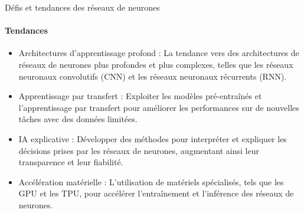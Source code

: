 \documentclass{beamer}
\begin{document}
\begin{frame}{Défis et tendances des réseaux de neurones}
\framesubtitle{Tendances}
	\begin{itemize}
		\item Architectures d'apprentissage profond : La tendance vers des architectures de réseaux de neurones plus profondes et plus complexes, telles que les réseaux neuronaux convolutifs (CNN) et les réseaux neuronaux récurrents (RNN).
		\item Apprentissage par transfert : Exploiter les modèles pré-entraînés et l'apprentissage par transfert pour améliorer les performances sur de nouvelles tâches avec des données limitées.
		\item IA explicative : Développer des méthodes pour interpréter et expliquer les décisions prises par les réseaux de neurones, augmentant ainsi leur transparence et leur fiabilité.
		\item Accélération matérielle : L'utilisation de matériels spécialisés, tels que les GPU et les TPU, pour accélérer l'entraînement et l'inférence des réseaux de neurones.
	\end{itemize}
\end{frame}
\end{document}

